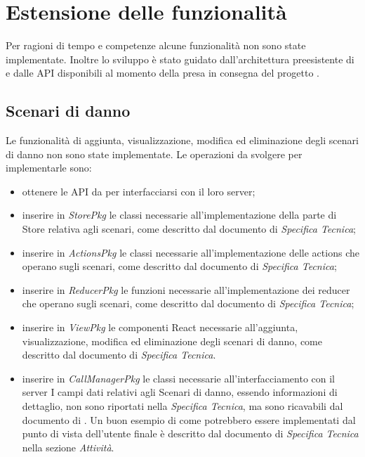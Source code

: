 \newpage

\section{Estensione delle funzionalità}
Per ragioni di tempo e competenze alcune funzionalità non sono state implementate. Inoltre lo sviluppo è stato guidato dall'architettura preesistente di \riskapp{} e dalle API disponibili al momento della presa in consegna del progetto \progetto.

\subsection{Scenari di danno}
Le funzionalità di aggiunta, visualizzazione, modifica ed eliminazione degli scenari di danno non sono state implementate. Le operazioni da svolgere per implementarle sono:
\begin{itemize}
	\item ottenere le API da \riskapp{} per interfacciarsi con il loro server;
	\item inserire in \textit{StorePkg} le classi necessarie all'implementazione della parte di Store relativa agli scenari, come descritto dal documento di \textit{Specifica Tecnica};
	\item inserire in \textit{ActionsPkg} le classi necessarie all'implementazione delle actions che operano sugli scenari, come descritto dal documento di \textit{Specifica Tecnica};
	\item inserire in \textit{ReducerPkg} le funzioni necessarie all'implementazione dei reducer che operano sugli scenari, come descritto dal documento di \textit{Specifica Tecnica};
	\item inserire in \textit{ViewPkg} le componenti React necessarie all'aggiunta, visualizzazione, modifica ed eliminazione degli scenari di danno, come descritto dal documento di \textit{Specifica Tecnica}.
	\item inserire in \textit{CallManagerPkg} le classi necessarie all'interfacciamento con il server \riskapp{}
	I campi dati relativi agli Scenari di danno, essendo informazioni di dettaglio, non sono riportati nella \textit{Specifica Tecnica}, ma sono ricavabili dal documento di \adr{}.
	Un buon esempio di come potrebbero essere implementati dal punto di vista dell'utente finale è descritto dal documento di \textit{Specifica Tecnica} nella sezione \textit{Attività}.
\end{itemize}

